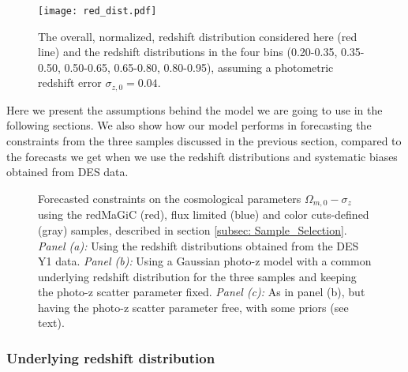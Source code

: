 \documentclass[a4paper,fleqn,usenatbib]{mnras}
\begin{document}
\begin{figure}
\centering
\texttt{[image: red\_dist.pdf]} 
\caption{The overall, normalized, redshift distribution considered here (red line)  and the redshift distributions in the four bins (0.20-0.35, 0.35-0.50, 0.50-0.65, 0.65-0.80, 0.80-0.95), assuming a photometric redshift error $\sigma_{z,0}=0.04$.}
\label{fig: red_dist_mod}
\end{figure}

Here we present the assumptions behind the model we are going to use in the following sections. We also show how our model performs in forecasting the constraints from the three samples discussed in the previous section, compared to the forecasts we get when we use the redshift distributions and systematic biases obtained from DES data.

\begin{figure*}
\centering
{}%
{}%
\caption{ Forecasted constraints on the cosmological parameters $\Omega_{m,0} - \sigma_z$ using the redMaGiC (red),  flux limited (blue) and color cuts-defined (gray) samples, described in section \ref{subsec: Sample_Selection}. {\textit{Panel (a):}} Using the redshift distributions obtained from the DES Y1 data. {\textit{Panel (b):}} Using a Gaussian photo-z model with a common underlying redshift distribution for the three samples and keeping the photo-z scatter parameter fixed.  {\textit{Panel (c):}} As in panel (b), but having the photo-z scatter parameter free, with some priors (see text).}
\label{fig: Data_and_model}
\end{figure*}


\subsubsection{Underlying redshift distribution}
\end{document}
